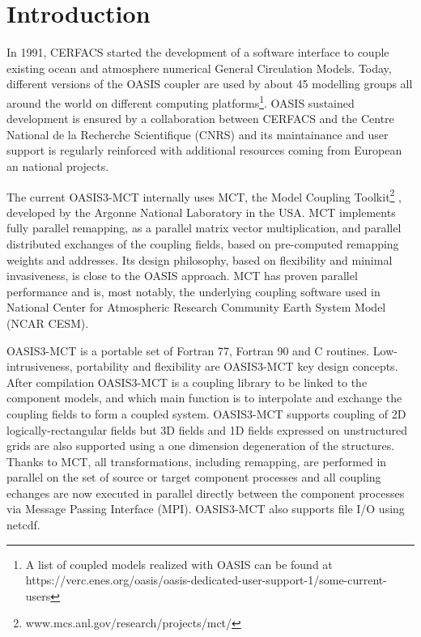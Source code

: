 \newpage
\chapter{Introduction}
\label{sec_step}

In 1991, CERFACS started the development of
a software interface to couple existing ocean and atmosphere numerical General
Circulation Models. Today, different versions of the 
OASIS coupler are used by about 45 modelling groups all around the
world on different computing platforms\footnote{A list of
coupled models realized with OASIS can be found at https://verc.enes.org/oasis/oasis-dedicated-user-support-1/some-current-users}.
OASIS sustained development is ensured by a collaboration
between CERFACS and the Centre National de la Recherche Scientifique
(CNRS) and its maintainance and user support is regularly reinforced
with additional resources coming from European an national projects.

The current OASIS3-MCT internally uses MCT, the Model
Coupling Toolkit\footnote{www.mcs.anl.gov/research/projects/mct/} \citep{mct_larson} \newline \citep{mct_jacob}, developed by the Argonne National Laboratory in the USA. MCT implements fully parallel remapping, as a parallel matrix vector 
multiplication, and parallel distributed exchanges of the coupling
fields, based on pre-computed remapping weights and addresses. 
Its design philosophy, based on flexibility and minimal invasiveness,
is close to the OASIS approach. 
MCT has proven parallel performance and is, most notably, the
underlying coupling software used in National Center for Atmospheric
Research Community Earth System Model (NCAR CESM).

OASIS3-MCT is a portable set of Fortran 77, Fortran 90 and C
routines. Low-intrusiveness, portability and flexibility are
OASIS3-MCT key design concepts. After compilation OASIS3-MCT is a
coupling library to be linked to the component models, and which main
function is to interpolate and exchange the coupling fields to form a coupled system.  OASIS3-MCT supports  coupling of 2D
logically-rectangular fields but 3D fields and 1D fields expressed on
unstructured grids are also supported using a one dimension
degeneration of the structures. Thanks to MCT, all transformations,
including remapping, are performed in parallel on the set of source or
target component processes and all coupling echanges are now executed
in parallel directly between the component processes via Message Passing Interface
(MPI). OASIS3-MCT also supports file I/O using netcdf. 

